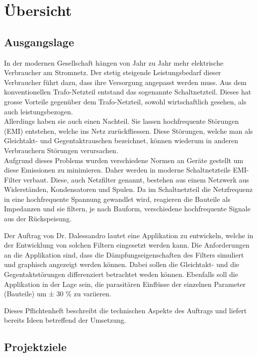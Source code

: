 \section{Übersicht} \label{sec:uebersicht}
\subsection{Ausgangslage}

In der modernen Gesellschaft hängen von Jahr zu Jahr mehr elektrische Verbraucher am Stromnetz. Der stetig steigende Leistungsbedarf dieser Verbraucher führt dazu, dass ihre Versorgung angepasst werden muss. Aus dem konventionellen Trafo-Netzteil entstand das sogenannte Schaltnetzteil. Dieses hat grosse Vorteile gegenüber dem Trafo-Netzteil, sowohl wirtschaftlich gesehen, als auch leistungsbezogen. 
\\Allerdings haben sie auch einen Nachteil. Sie lassen hochfrequente Störungen (EMI) entstehen, welche ins Netz zurückfliessen. Diese Störungen, welche man als Gleichtakt- und Gegentaktrauschen bezeichnet, können wiederum in anderen Verbrauchern  Störungen verursachen. 
\\Aufgrund dieses Problems wurden verschiedene Normen an Geräte gestellt um diese Emissionen zu minimieren. Daher werden in moderne Schaltnetzteile EMI-Filter verbaut.  Diese, auch Netzfilter genannt, bestehen aus einem Netzwerk  aus Widerständen, Kondensatoren und Spulen. Da im Schaltnetzteil die Netzfrequenz in eine hochfrequente Spannung gewandlet wird, reagieren die Bauteile als Impedanzen und sie filtern, je nach Bauform, verschiedene hochfrequente Signale aus der Rückspeisung.


Der Auftrag von Dr. Dalessandro lautet eine Applikation zu entwickeln, welche in der Entwicklung von solchen Filtern eingesetzt werden kann. Die Anforderungen an die Applikation sind, dass die Dämpfungseigenschaften des Filters simuliert und graphisch angezeigt werden können. Dabei sollen die Gleichtakt- und die Gegentaktstörungen differenziert betrachtet weden können. Ebenfalls soll die Applikation in der Lage sein, die parasitären Einflüsse der einzelnen Parameter (Bauteile) um ± 30 \% zu variieren.   


Dieses Pflichtenheft beschreibt die technischen Aspekte des Auftrags und liefert bereits Ideen betreffend der Umsetzung. 
 

\newpage
\subsection{Projektziele} \label{subsec:projektziele}


